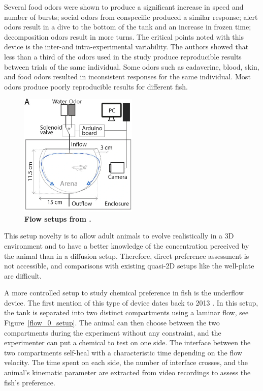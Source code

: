     Several food odors were shown to produce a significant increase in speed and number of bursts; social odors from conspecific produced a similar response; alert odors result in a dive to the bottom of the tank and an increase in frozen time; decomposition odors result in more turns. The critical points noted with this device is the inter-and intra-experimental variability. The authors showed that less than a third of the odors used in the study produce reproducible results between trials of the same individual. Some odors such as cadaverine, blood, skin, and food odors resulted in inconsistent responses for the same individual. Most odors produce poorly reproducible results for different fish.

    \begin{figure}[h]
      \centering
      \includegraphics[width=0.5\textwidth]{part_2/assets/flow_1.png}
      \caption{\textbf{Flow setups from \cite{kermen2020stimulus}.}}
      \label{flow_1_setup}
    \end{figure}

    This setup novelty is to allow adult animals to evolve realistically in a 3D environment and to have a better knowledge of the concentration perceived by the animal than in a diffusion setup. Therefore, direct preference assessment is not accessible, and comparisons with existing quasi-2D setups like the well-plate are difficult.

    A more controlled setup to study chemical preference in fish is the underflow device. The first mention of this type of device dates back to 2013 \cite{readman2013fish}. In this setup, the tank is separated into two distinct compartments using a laminar flow, see Figure~\ref{flow_0_setup}. The animal can then choose between the two compartments during the experiment without any constraint, and the experimenter can put a chemical to test on one side. The interface between the two compartments self-heal with a characteristic time depending on the flow velocity. The time spent on each side, the number of interface crosses, and the animal's kinematic parameter are extracted from video recordings to assess the fish's preference.

